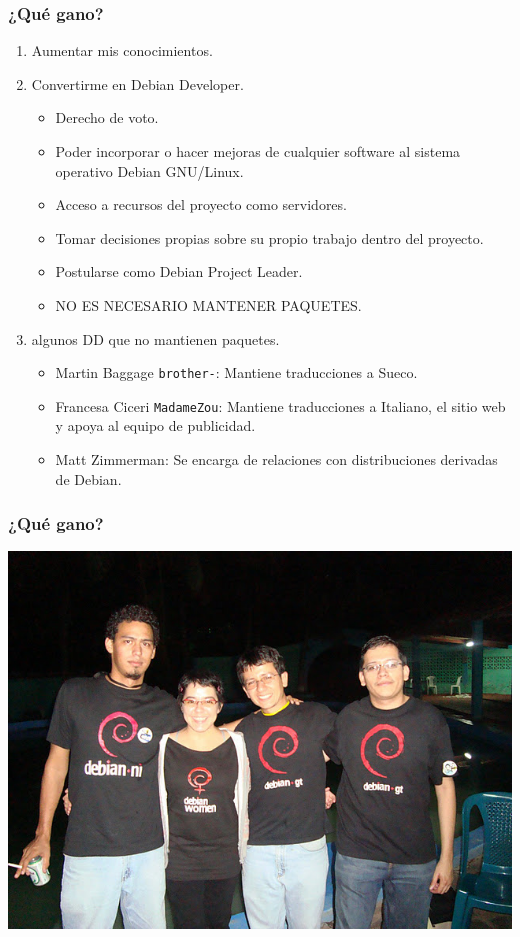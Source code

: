 \documentclass{beamer}
\begin{document}
\begin{frame}
\frametitle{¿Qu\'e gano?}
             \begin{enumerate}
		\pause \item Aumentar mis conocimientos.
		\pause \item Convertirme en Debian Developer.
		\begin {itemize}
			\pause \item Derecho de voto.
			\pause \item Poder incorporar o hacer mejoras de cualquier software al sistema operativo Debian GNU/Linux.
			\pause \item Acceso a recursos del proyecto como servidores.
			\pause \item Tomar decisiones propias sobre su propio trabajo dentro del proyecto.
			\pause \item Postularse como Debian Project Leader.
			\pause \item \alert{NO ES NECESARIO MANTENER PAQUETES.}
		\end{itemize}
		\pause \item algunos DD que no mantienen paquetes.
		\begin{itemize}
			\pause \item Martin Baggage \texttt{brother-}: Mantiene traducciones a Sueco.
			\pause \item Francesa Ciceri \texttt{MadameZou}: Mantiene traducciones a Italiano, el sitio web y apoya al equipo de publicidad.
			\pause \item Matt Zimmerman: Se encarga de relaciones con distribuciones derivadas de Debian.
		\end{itemize}
	     \end{enumerate}
\end{frame}

\begin{frame}
\frametitle{¿Qu\'e gano?}
	\begin{center}
                 \includegraphics[scale=0.30]{../img/DSC03610.JPG}
	\end{center}
\end{frame}
\end{document}
